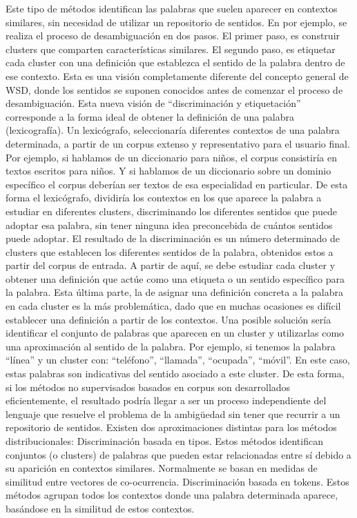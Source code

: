 Este tipo de métodos identifican las palabras que suelen aparecer en contextos similares, sin necesidad de utilizar un repositorio de sentidos. En \cite{009} por ejemplo, se realiza el proceso de desambiguación en dos pasos. El primer paso, es construir clusters que comparten características similares. El segundo paso, es etiquetar cada cluster con una definición que establezca el sentido de la palabra dentro de ese contexto. Esta es una visión completamente diferente del concepto general de WSD, donde los sentidos se suponen conocidos antes de comenzar el proceso de desambiguación. Esta nueva visión de “discriminación y etiquetación” corresponde a la forma ideal de obtener la definición de una palabra (lexicografía). Un lexicógrafo, seleccionaría diferentes contextos de una palabra determinada, a partir de un corpus extenso y representativo para el usuario final. Por ejemplo, si hablamos de un diccionario para niños, el corpus consistiría en textos escritos para niños. Y si hablamos de un diccionario sobre un dominio específico el corpus deberían ser textos de esa especialidad en particular. De esta forma el lexicógrafo, dividiría los contextos en los que aparece la palabra a estudiar en diferentes clusters, discriminando los diferentes sentidos que puede adoptar esa palabra, sin tener ninguna idea preconcebida de cuántos sentidos puede adoptar. El resultado de la discriminación es un número determinado de clusters que establecen los diferentes sentidos de la palabra, obtenidos estos a partir del corpus de entrada. A partir de aquí, se debe estudiar cada cluster y obtener una definición que actúe como una etiqueta o un sentido específico para la palabra. Esta última parte, la de asignar una definición concreta a la palabra en cada cluster es la más problemática, dado que en muchas ocasiones es difícil establecer una definición a partir de los contextos. Una posible solución sería identificar el conjunto de palabras que aparecen en un cluster y utilizarlas como una aproximación al sentido de la palabra. Por ejemplo, si tenemos la palabra “línea” y un cluster con: “teléfono”, “llamada”, “ocupada”, “móvil”. En este caso, estas palabras son indicativas del sentido asociado a este cluster. De esta forma, si los métodos no supervisados basados en corpus son desarrollados eficientemente, el resultado podría llegar a ser un proceso independiente del lenguaje que resuelve el problema de la ambigüedad sin tener que recurrir a un repositorio de sentidos. Existen dos aproximaciones distintas para los métodos distribucionales: Discriminación basada en tipos. Estos métodos identifican conjuntos (o clusters) de palabras que pueden estar relacionadas entre sí debido a su aparición en contextos similares. Normalmente se basan en medidas de similitud entre vectores de co-ocurrencia. Discriminación basada en tokens. Estos métodos agrupan todos los contextos donde una palabra determinada aparece, basándose en la similitud de estos contextos.

